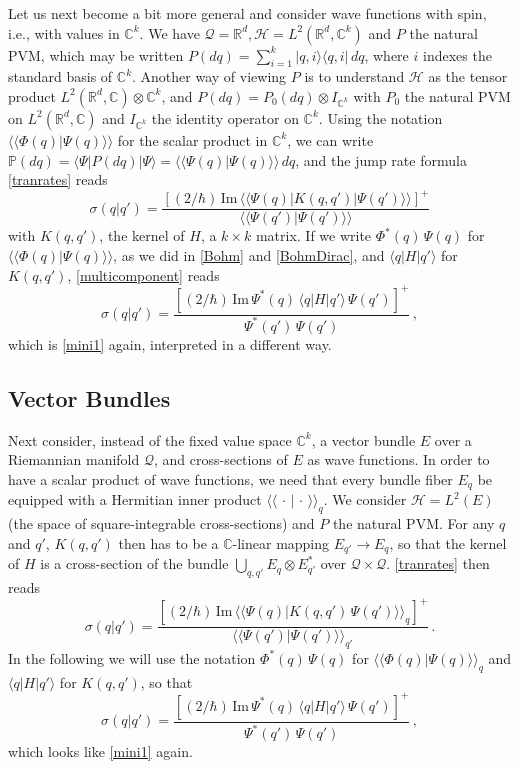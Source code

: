 \documentclass[12pt]{article}
\newcommand{\CCC}{\mathbb{C}} %
\newcommand{\RRR}{\mathbb{R}} %
\newcommand{\1}{\mathbf{1}} %
\renewcommand{\Im}{\mathrm{Im}} %
\newcommand{\Hilbert}{\mathscr{H}}
\renewcommand{\sp}[2]{\langle #1 | #2 \rangle} %
\newcommand{\scalar}[2]{\langle\!\langle #1 | #2 \rangle\!\rangle} %
\newcommand{\conf}{\mathcal{Q}} %
\newcommand{\measure}{\mathbb{P}} %
\newcommand{\pov}{{P}}%
\begin{document}
Let us next become a bit more general and consider wave functions with
spin, i.e., with values in $\CCC^k$. We have $\conf = \RRR^d, \Hilbert
= L^2(\RRR^d,\CCC^k)$ and $\pov$ the natural PVM, which may be written
$\pov(dq) = \sum_{i=1}^k |q,i\rangle \langle q,i| \, dq$, where $i$
indexes the standard basis of $\CCC^k$. Another way of viewing $\pov$
is to understand $\Hilbert$ as the tensor product $L^2(\RRR^d,\CCC)
\otimes \CCC^k$, and $\pov(dq) = \pov_0(dq) \otimes I_{\CCC^k}$ with
$\pov_0$ the natural PVM on $L^2(\RRR^d,\CCC)$ and $I_{\CCC^k}$ the
identity operator on $\CCC^k$. Using the notation
$\scalar{\Phi(q)}{\Psi(q)}$ for the scalar product in $\CCC^k$, we can
write $\measure(dq) = \sp{\Psi}{\pov(dq)| \Psi} =
\scalar{\Psi(q)}{\Psi(q)} \, dq$, and the jump rate formula
\eqref{tranrates} reads
\begin{equation}\label{multicomponent}
   \sigma(q|q') = \frac{[(2/\hbar) \, \Im \,
   \scalar{\Psi(q)}{K(q,q')|\Psi(q')}]^+}{\scalar{\Psi(q')}{\Psi(q')}}
\end{equation}
with $K(q,q')$, the kernel of $H$, a $k \times k$ matrix. If we write
$\Phi^*(q) \, \Psi(q)$ for $\scalar{\Phi(q)}{\Psi(q)}$, as we did in
\eqref{Bohm} and \eqref{BohmDirac}, and $\sp{q}{H|q'}$ for $K(q,q')$,
\eqref{multicomponent} reads
\[
   \sigma(q|q') = \frac{[(2/\hbar) \, \Im \, \Psi^*(q) \, \sp{q}{H|q'}
   \, \Psi(q')]^+}{\Psi^*(q') \, \Psi(q')}\,,
\]
which is \eqref{mini1} again, interpreted in a different way.


\subsection{Vector Bundles}\label{sec:exbundle}

Next consider, instead of the fixed value space $\CCC^k$, a vector
bundle $E$ over a Riemannian manifold $\conf$, and cross-sections of
$E$ as wave functions.  In order to have a scalar product of wave
functions, we need that every bundle fiber $E_q$ be equipped with a
Hermitian inner product $\scalar{\,\cdot\,}{\,\cdot\,}_q$.  We
consider $\Hilbert = L^2(E)$ (the space of square-integrable
cross-sections) and $\pov$ the natural PVM. For any $q$ and $q'$,
$K(q,q')$ then has to be a $\CCC$-linear mapping $E_{q'} \to E_q$, so
that the kernel of $H$ is a cross-section of the bundle
$\bigcup_{q,q'} E_q \otimes E^*_{q'}$ over $\conf \times \conf$.
\eqref{tranrates} then reads
\begin{equation}\label{bundlerates}
   \sigma(q|q') = \frac{[(2/\hbar) \, \Im \, \scalar{\Psi(q)} {K(q,q')
   \, \Psi(q')}_q]^+} {\scalar{\Psi(q')} {\Psi(q')}_{q'}}\,.
\end{equation}
In the following we will use the notation $\Phi^*(q) \, \Psi(q)$ for
$\scalar{\Phi(q)}{\Psi(q)}_q$ and $\sp{q}{H|q'}$ for $K(q,q')$, so
that
\[
   \sigma(q|q') = \frac{[(2/\hbar) \, \Im \, \Psi^*(q) \, \sp{q}{H|q'}
   \, \Psi(q')]^+}{\Psi^*(q') \, \Psi(q')}\,,
\]
which looks like \eqref{mini1} again.
\end{document}
